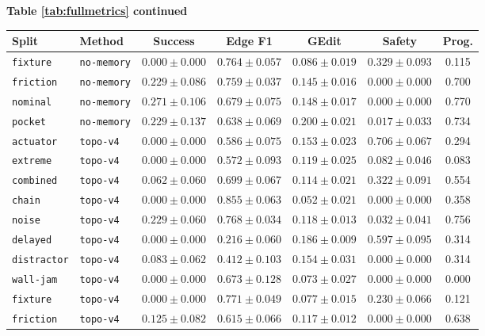\documentclass{article}
\begin{document}
\begin{center}
\textbf{Table \ref{tab:fullmetrics} continued}\\[0.4ex]
\begin{tabular}{llccccc}
\toprule
Split & Method & Success & Edge F1 & GEdit & Safety & Prog. \\
\midrule
\texttt{fixture} & \texttt{no-memory} & $0.000 \pm 0.000$ & $0.764 \pm 0.057$ & $0.086 \pm 0.019$ & $0.329 \pm 0.093$ & 0.115 \\
\texttt{friction} & \texttt{no-memory} & $0.229 \pm 0.086$ & $0.759 \pm 0.037$ & $0.145 \pm 0.016$ & $0.000 \pm 0.000$ & 0.700 \\
\texttt{nominal} & \texttt{no-memory} & $0.271 \pm 0.106$ & $0.679 \pm 0.075$ & $0.148 \pm 0.017$ & $0.000 \pm 0.000$ & 0.770 \\
\texttt{pocket} & \texttt{no-memory} & $0.229 \pm 0.137$ & $0.638 \pm 0.069$ & $0.200 \pm 0.021$ & $0.017 \pm 0.033$ & 0.734 \\
\texttt{actuator} & \texttt{topo-v4} & $0.000 \pm 0.000$ & $0.586 \pm 0.075$ & $0.153 \pm 0.023$ & $0.706 \pm 0.067$ & 0.294 \\
\texttt{extreme} & \texttt{topo-v4} & $0.000 \pm 0.000$ & $0.572 \pm 0.093$ & $0.119 \pm 0.025$ & $0.082 \pm 0.046$ & 0.083 \\
\texttt{combined} & \texttt{topo-v4} & $0.062 \pm 0.060$ & $0.699 \pm 0.067$ & $0.114 \pm 0.021$ & $0.322 \pm 0.091$ & 0.554 \\
\texttt{chain} & \texttt{topo-v4} & $0.000 \pm 0.000$ & $0.855 \pm 0.063$ & $0.052 \pm 0.021$ & $0.000 \pm 0.000$ & 0.358 \\
\texttt{noise} & \texttt{topo-v4} & $0.229 \pm 0.060$ & $0.768 \pm 0.034$ & $0.118 \pm 0.013$ & $0.032 \pm 0.041$ & 0.756 \\
\texttt{delayed} & \texttt{topo-v4} & $0.000 \pm 0.000$ & $0.216 \pm 0.060$ & $0.186 \pm 0.009$ & $0.597 \pm 0.095$ & 0.314 \\
\texttt{distractor} & \texttt{topo-v4} & $0.083 \pm 0.062$ & $0.412 \pm 0.103$ & $0.154 \pm 0.031$ & $0.000 \pm 0.000$ & 0.314 \\
\texttt{wall-jam} & \texttt{topo-v4} & $0.000 \pm 0.000$ & $0.673 \pm 0.128$ & $0.073 \pm 0.027$ & $0.000 \pm 0.000$ & 0.000 \\
\texttt{fixture} & \texttt{topo-v4} & $0.000 \pm 0.000$ & $0.771 \pm 0.049$ & $0.077 \pm 0.015$ & $0.230 \pm 0.066$ & 0.121 \\
\texttt{friction} & \texttt{topo-v4} & $0.125 \pm 0.082$ & $0.615 \pm 0.066$ & $0.117 \pm 0.012$ & $0.000 \pm 0.000$ & 0.638 \\

\end{tabular}
\end{center}
\end{document}
